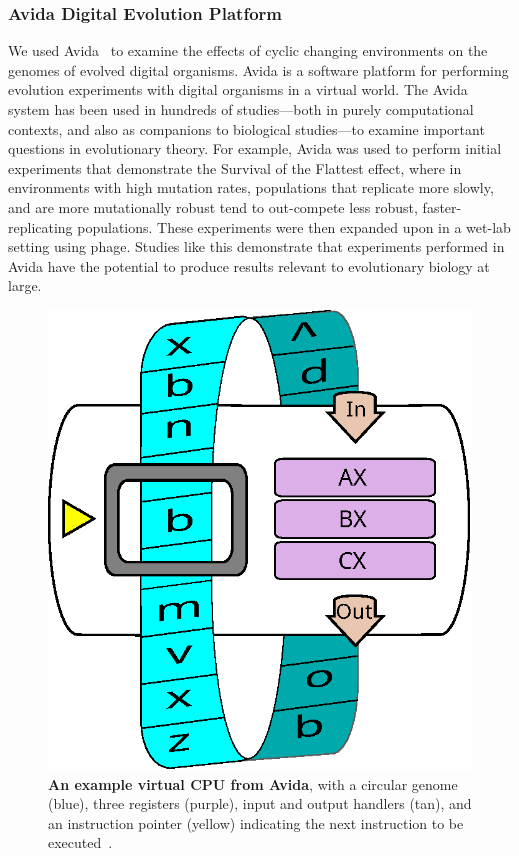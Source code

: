 \documentclass[10pt,letterpaper,final]{article}
\begin{document}
\subsubsection*{Avida Digital Evolution Platform}
We used Avida~\cite{lenski_evolutionary_2003} to examine the effects of cyclic changing environments on the genomes of evolved digital organisms. Avida is a software platform for performing evolution experiments with digital organisms in a virtual world. 
The Avida system has been used in hundreds of studies---both in purely computational contexts, and also as companions to biological studies---to examine important questions in evolutionary theory. For example, Avida was used to perform initial experiments that demonstrate the Survival of the Flattest effect\cite{wilke_evolution_2001}, where in environments with high mutation rates, populations that replicate more slowly, and are more mutationally robust tend to out-compete less robust, faster-replicating populations. These experiments were then expanded upon in a wet-lab setting using phage\cite{codoner_fittest_2006}. Studies like this demonstrate that experiments performed in Avida have the potential to produce results relevant to evolutionary biology at large.
\begin{figure}[!h]
\includegraphics[width=0.65\columnwidth]{figures/methods/fig1.eps}
\caption{{\bf An example virtual CPU from Avida}, with a circular genome (blue), three registers (purple), input and output handlers (tan), and an instruction pointer (yellow) indicating the next instruction to be executed~\cite{canino-koning_evolution_2016}.%
}\label{fig:cpu}
\end{figure}
\end{document}
